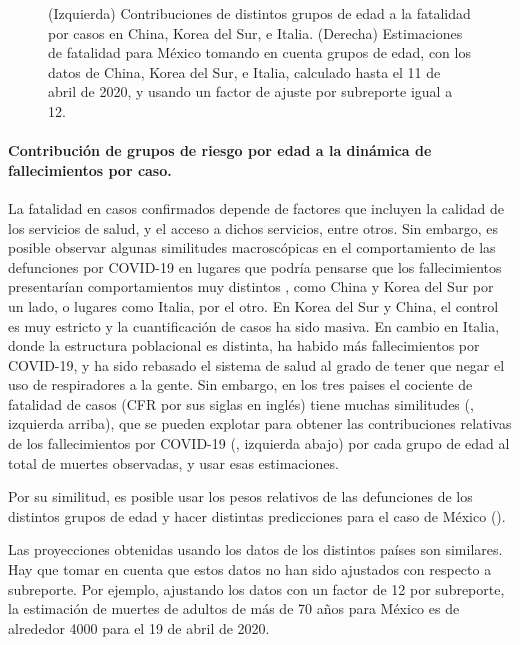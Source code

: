 \documentclass[8pt]{article}
\begin{document}
\begin{figure}[th]
\begin{minipage}{0.5\textwidth}
\end{minipage}
\caption{(Izquierda) Contribuciones de distintos grupos de edad a la fatalidad por casos en China, Korea del Sur, e Italia. (Derecha) Estimaciones de fatalidad para México tomando en cuenta grupos de edad, con los datos de China, Korea del Sur, e Italia, calculado hasta el 11 de abril de 2020, y usando un factor de ajuste por subreporte igual a 12. }\label{fig:estimates}
\end{figure}

\vspace{0.5cm}
\paragraph{Contribución de grupos de riesgo por edad a la dinámica de fallecimientos por caso.}
La fatalidad en casos confirmados depende de factores que incluyen la calidad de los servicios de salud, y el acceso a dichos servicios, entre otros. 
Sin embargo, es posible observar algunas similitudes macroscópicas en el comportamiento de las defunciones por COVID-19 en lugares que podría pensarse que los fallecimientos presentarían comportamientos muy distintos , como China y Korea del Sur por un lado, o lugares como Italia, por el otro. 
En Korea del Sur y China, el control es muy estricto y la cuantificación de casos ha sido masiva. 
En cambio en Italia, donde la estructura poblacional es distinta, ha habido más fallecimientos por COVID-19, y ha sido rebasado el sistema de salud al grado de tener que negar el uso de respiradores a la gente. 
Sin embargo, en los tres paises el cociente de fatalidad de casos (CFR por sus siglas en inglés) tiene muchas similitudes (, izquierda arriba), que se pueden explotar para obtener las contribuciones relativas de los fallecimientos por COVID-19 (, izquierda abajo) por cada grupo de edad al total de muertes observadas, y usar esas estimaciones. 

Por su similitud, es posible usar los pesos relativos de las defunciones de los distintos grupos de edad y  hacer distintas predicciones para el caso de México ().



Las proyecciones obtenidas usando los datos de los distintos países son similares. Hay que tomar en cuenta que estos datos no han sido ajustados con respecto a subreporte. Por ejemplo, ajustando los datos con un factor de 12 por subreporte, la estimación de  muertes de adultos de más de 70 años para México es  de alrededor 4000 para el 19 de abril de 2020. 
\end{document}
